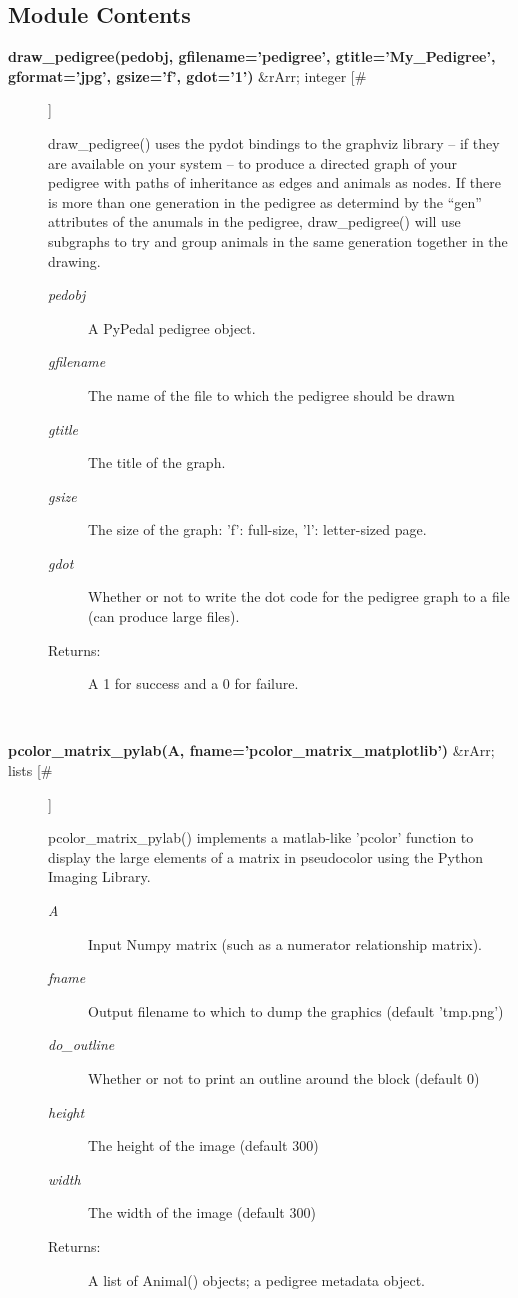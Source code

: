 \documentclass[10pt]{article}
\begin{document}
\subsection*{Module Contents}
\begin{description}
\item[\textbf{draw\_pedigree(pedobj, gfilename='pedigree', gtitle='My\_Pedigree', gformat='jpg', gsize='f', gdot='1')}
 \&rArr; integer [\#]]

 draw\_pedigree() uses the pydot bindings to the graphviz library -- if they are available on your system -- to produce a directed graph of your pedigree with paths of inheritance as edges and animals as nodes. If there is more than one generation in the pedigree as determind by the ``gen'' attributes of the anumals in the pedigree, draw\_pedigree() will use subgraphs to try and group animals in the same generation together in the drawing.
\begin{description}
\item[\emph{pedobj}
] A PyPedal pedigree object.
\item[\emph{gfilename}
] The name of the file to which the pedigree should be drawn
\item[\emph{gtitle}
] The title of the graph.
\item[\emph{gsize}
] The size of the graph: 'f': full-size, 'l': letter-sized page.
\item[\emph{gdot}
] Whether or not to write the dot code for the pedigree graph to a file (can produce large files).
\item[Returns:] A 1 for success and a 0 for failure.

\end{description}
\\ 

\item[\textbf{pcolor\_matrix\_pylab(A, fname='pcolor\_matrix\_matplotlib')}
 \&rArr; lists [\#]]

 pcolor\_matrix\_pylab() implements a matlab-like 'pcolor' function to display the large elements of a matrix in pseudocolor using the Python Imaging Library.
\begin{description}
\item[\emph{A}
] Input Numpy matrix (such as a numerator relationship matrix).
\item[\emph{fname}
] Output filename to which to dump the graphics (default 'tmp.png')
\item[\emph{do\_outline}
] Whether or not to print an outline around the block (default 0)
\item[\emph{height}
] The height of the image (default 300)
\item[\emph{width}
] The width of the image (default 300)
\item[Returns:] A list of Animal() objects; a pedigree metadata object.


\end{description}
\end{description}
\end{document}
